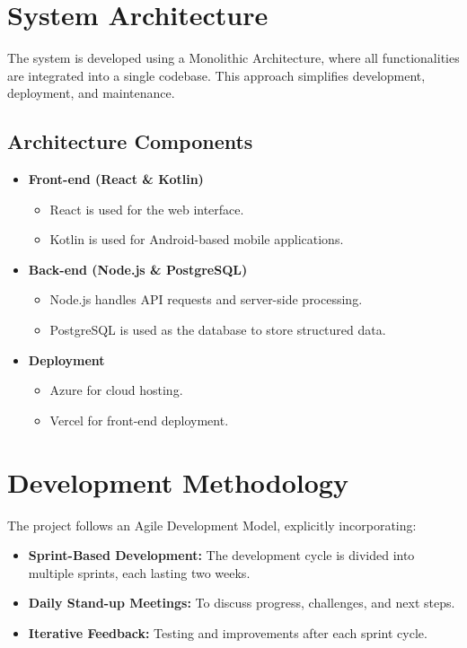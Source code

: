\section{System Architecture}
The system is developed using a Monolithic Architecture, where all functionalities are integrated into a single codebase. This approach simplifies development, deployment, and maintenance.

\subsection{Architecture Components}
\begin{itemize}
    \item \textbf{Front-end (React \& Kotlin)}
        \begin{itemize}
            \item React is used for the web interface.
            \item Kotlin is used for Android-based mobile applications.
        \end{itemize}
    \item \textbf{Back-end (Node.js \& PostgreSQL)}
        \begin{itemize}
            \item Node.js handles API requests and server-side processing.
            \item PostgreSQL is used as the database to store structured data.
        \end{itemize}
    \item \textbf{Deployment}
        \begin{itemize}
            \item Azure for cloud hosting.
            \item Vercel for front-end deployment.
        \end{itemize}
\end{itemize}

\section{Development Methodology}
The project follows an Agile Development Model, explicitly incorporating:
\begin{itemize}
    \item \textbf{Sprint-Based Development:} The development cycle is divided into multiple sprints, each lasting two weeks.
    \item \textbf{Daily Stand-up Meetings:} To discuss progress, challenges, and next steps.
    \item \textbf{Iterative Feedback:} Testing and improvements after each sprint cycle.
\end{itemize}

